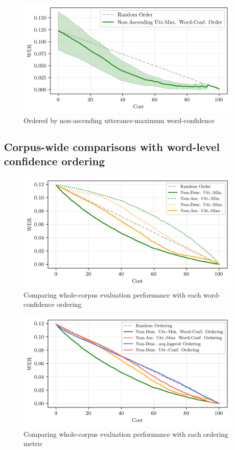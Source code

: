 \begin{figure}[p]
 \caption{Ordered by non-ascending utterance-maximum word-confidence}
 \label{fig:word-conf-comparison-plot4}
 \includegraphics[width=\textwidth]{figures/word-conf-comparison-plot4.png}
 \centering
\end{figure}

\clearpage
\subsection{Corpus-wide comparisons with word-level confidence ordering}\label{subsec:comparing-all}

\begin{figure}[h!]
 \caption{Comparing whole-corpus evaluation performance with each word-confidence ordering}
 \label{fig:corpus-all-word-conf-measures}
 \includegraphics[width=\textwidth]{figures/corpus-all-word-conf-measures.png}
 \centering
\end{figure}
\begin{figure}[h!]
 \caption{Comparing whole-corpus evaluation performance with each ordering metric}
 \label{fig:corpus-allmeasures}
 \includegraphics[width=\textwidth]{figures/corpus-allmeasures.png}
 \centering
\end{figure}

